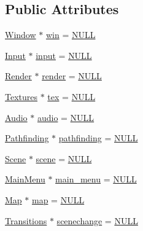 \subsection*{Public Attributes}
\begin{DoxyCompactItemize}
\item 
\mbox{\hyperlink{class_window}{Window}} $\ast$ \mbox{\hyperlink{class_main_app_a7cc625840e9468586754c26af6712479}{win}} = \mbox{\hyperlink{_defs_8h_a070d2ce7b6bb7e5c05602aa8c308d0c4}{N\+U\+LL}}
\item 
\mbox{\hyperlink{class_input}{Input}} $\ast$ \mbox{\hyperlink{class_main_app_a08bb55fc8d6fa5958250362012327477}{input}} = \mbox{\hyperlink{_defs_8h_a070d2ce7b6bb7e5c05602aa8c308d0c4}{N\+U\+LL}}
\item 
\mbox{\hyperlink{class_render}{Render}} $\ast$ \mbox{\hyperlink{class_main_app_aa75ce242cddd00557eb67cf8d098454d}{render}} = \mbox{\hyperlink{_defs_8h_a070d2ce7b6bb7e5c05602aa8c308d0c4}{N\+U\+LL}}
\item 
\mbox{\hyperlink{class_textures}{Textures}} $\ast$ \mbox{\hyperlink{class_main_app_a16ce0e1da421d3e91aec508bd6fb205e}{tex}} = \mbox{\hyperlink{_defs_8h_a070d2ce7b6bb7e5c05602aa8c308d0c4}{N\+U\+LL}}
\item 
\mbox{\hyperlink{class_audio}{Audio}} $\ast$ \mbox{\hyperlink{class_main_app_aa275adc9bd13346379334753e0ab5e50}{audio}} = \mbox{\hyperlink{_defs_8h_a070d2ce7b6bb7e5c05602aa8c308d0c4}{N\+U\+LL}}
\item 
\mbox{\hyperlink{class_pathfinding}{Pathfinding}} $\ast$ \mbox{\hyperlink{class_main_app_a095b19753a9468b930b9dbd0afa7fb18}{pathfinding}} = \mbox{\hyperlink{_defs_8h_a070d2ce7b6bb7e5c05602aa8c308d0c4}{N\+U\+LL}}
\item 
\mbox{\hyperlink{class_scene}{Scene}} $\ast$ \mbox{\hyperlink{class_main_app_af244b9804fb7da7c0163913de2faeb1b}{scene}} = \mbox{\hyperlink{_defs_8h_a070d2ce7b6bb7e5c05602aa8c308d0c4}{N\+U\+LL}}
\item 
\mbox{\hyperlink{class_main_menu}{Main\+Menu}} $\ast$ \mbox{\hyperlink{class_main_app_acf91e5617a0dc069b454c2b21ab07fe7}{main\+\_\+menu}} = \mbox{\hyperlink{_defs_8h_a070d2ce7b6bb7e5c05602aa8c308d0c4}{N\+U\+LL}}
\item 
\mbox{\hyperlink{class_map}{Map}} $\ast$ \mbox{\hyperlink{class_main_app_ad8c323fb3c0e2cb5b118eeb058f463e0}{map}} = \mbox{\hyperlink{_defs_8h_a070d2ce7b6bb7e5c05602aa8c308d0c4}{N\+U\+LL}}
\item 
\mbox{\hyperlink{class_transitions}{Transitions}} $\ast$ \mbox{\hyperlink{class_main_app_a1dc54119bf13dd883759de50361dbc1c}{scenechange}} = \mbox{\hyperlink{_defs_8h_a070d2ce7b6bb7e5c05602aa8c308d0c4}{N\+U\+LL}}

\end{DoxyCompactItemize}
